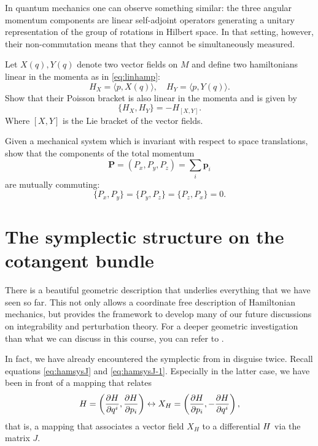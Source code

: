 \documentclass[english,fontsize=11pt,paper=a5,oneside]{scrbook}
\newcommand{\bp}{\bm{p}}
\let\d\relax
\newcommand{\d}{\mathrm{d}}
\theoremstyle{definition}
\newenvironment{example}
  {\pushQED{\qed}\renewcommand{\qedsymbol}{$\lozenge$}\examplex}
  {\popQED\endexamplex}
\newenvironment{exercise}
  {\pushQED{\qed}\renewcommand{\qedsymbol}{$\maltese$}\exercisex}
  {\popQED\endexercisex}
\begin{document}
\begin{example}
  In quantum mechanics one can observe something similar: the three angular momentum components are linear self-adjoint operators generating a unitary representation of the group of rotations in Hilbert space.
  In that setting, however, their non-commutation means that they cannot be simultaneously measured.
\end{example}

\begin{exercise}
  Let $X(q), Y(q)$ denote two vector fields on $M$ and define two hamiltonians linear in the momenta as in \eqref{eq:linhamp}:
  \begin{equation}
    H_X = \langle p, X(q)\rangle,\quad H_Y = \langle p, Y(q) \rangle.
  \end{equation}
  Show that their Poisson bracket is also linear in the momenta and is given by
  \begin{equation}
    \big\{H_X, H_Y\big\} = - H_{[X,Y]}.
  \end{equation}
  Where $[X,Y]$ is the Lie bracket of the vector fields.
\end{exercise}

\begin{exercise}
  Given a mechanical system which is invariant with respect to space translations, show that the components of the total momentum
  \begin{equation}
    \bm P = (P_x, P_y, P_z) = \sum_i \bp_i
  \end{equation}
  are mutually commuting:
  \begin{equation}
    \big\{P_x, P_y\big\}
    =\big\{P_y, P_z\big\}
    =\big\{P_z, P_x\big\}
    =0.
  \end{equation}
\end{exercise}

\section{The symplectic structure on the cotangent bundle}

There is a beautiful geometric description that underlies everything that we have seen so far.
This not only allows a coordinate free description of Hamiltonian mechanics, but provides the framework to develop many of our future discussions on integrability and perturbation theory.
For a deeper geometric investigation than what we can discuss in this course, you can refer to \cite{book:dasilva}.

In fact, we have already encountered the symplectic from in disguise twice.
Recall equations \eqref{eq:hamsysJ} and \eqref{eq:hamsysJ-1}. Especially in the latter case, we have been in front of a mapping that relates
\begin{equation}
  \d H = \left(\frac{\partial H}{\partial q^i}, \frac{\partial H}{\partial p_i}\right) \leftrightarrow X_H = \left(\frac{\partial H}{\partial p_i}, - \frac{\partial H}{\partial q^i}\right),
\end{equation}
that is, a mapping that associates a vector field $X_H$ to a differential $\d H$ via the matrix $J$.
\end{document}
